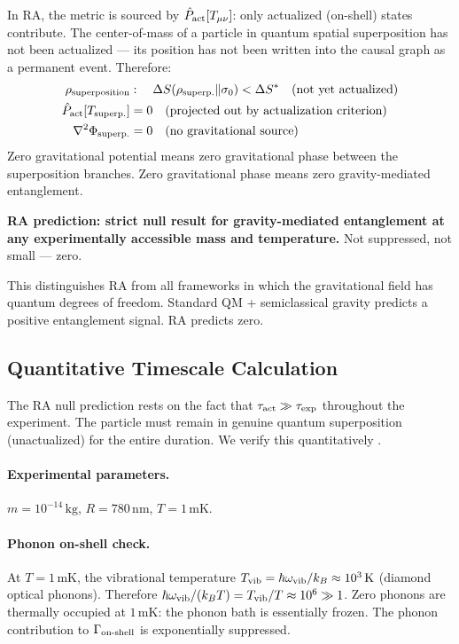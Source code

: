 \documentclass[12pt,a4paper]{article}
\begin{document}
In RA, the metric is sourced by $\hat{P}_{\mathrm{act}}[T_{\mu\nu}]$: only actualized (on-shell) states contribute.  The center-of-mass of a particle in quantum spatial superposition has not been actualized --- its position has not been written into the causal graph as a permanent event.  Therefore:
\begin{align}
  \rho_{\rm superposition} &: \quad\Delta S(\rho_{\rm superp.}\|\sigma_0) < \Delta S^*\quad \text{(not yet actualized)} \\
  \hat{P}_{\mathrm{act}}[T_{\rm superp.}] &= 0 \quad \text{(projected out by actualization criterion)} \\
  \nabla^2\Phi_{\rm superp.} &= 0 \quad \text{(no gravitational source)}
\end{align}
Zero gravitational potential means zero gravitational phase between the superposition branches.  Zero gravitational phase means zero gravity-mediated entanglement.

\textbf{RA prediction: strict null result for gravity-mediated entanglement at any experimentally accessible mass and temperature.}  Not suppressed, not small --- zero.

This distinguishes RA from all frameworks in which the gravitational field has quantum degrees of freedom.  Standard QM + semiclassical gravity predicts a positive entanglement signal.  RA predicts zero.

\subsection{Quantitative Timescale Calculation}

The RA null prediction rests on the fact that $\tau_{\rm act}\gg\tau_{\rm exp}$ throughout the experiment.  The particle must remain in genuine quantum superposition (unactualized) for the entire duration.  We verify this quantitatively \statusDR.

\paragraph{Experimental parameters.}  $m=10^{-14}\,\mathrm{kg}$, $R=780\,\mathrm{nm}$, $T=1\,\mathrm{mK}$.

\paragraph{Phonon on-shell check.}  At $T=1\,\mathrm{mK}$, the vibrational temperature $T_{\rm vib}=\hbar\omega_{\rm vib}/k_B\approx10^3\,\mathrm{K}$ (diamond optical phonons).  Therefore $\hbar\omega_{\rm vib}/(k_BT)=T_{\rm vib}/T\approx10^6\gg1$.  Zero phonons are thermally occupied at $1\,\mathrm{mK}$: the phonon bath is essentially frozen.  The phonon contribution to $\Gamma_{\rm on\text{-}shell}$ is exponentially suppressed.
\end{document}
